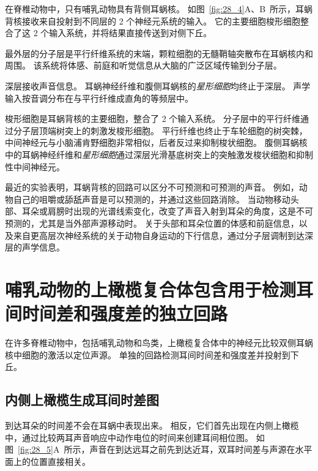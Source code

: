 在脊椎动物中，只有哺乳动物具有背侧耳蜗核。
如图~\ref{fig:28_4}A、B~所示，耳蜗背核接收来自投射到不同层的 2 个神经元系统的输入。
它的主要细胞梭形细胞整合了这 2 个输入系统，并将结果直接传送到对侧下丘。


最外层的分子层是平行纤维系统的末端，颗粒细胞的无髓鞘轴突散布在耳蜗核内和周围。
该系统将体感、前庭和听觉信息从大脑的广泛区域传输到分子层。


深层接收声音信息。
耳蜗神经纤维和腹侧耳蜗核的\textit{星形细胞}均终止于深层。
声学输入按音调分布在与平行纤维成直角的等频层中。


梭形细胞是耳蜗背核的主要细胞，整合了 2 个输入系统。
分子层中的平行纤维通过分子层顶端树突上的刺激发梭形细胞。
平行纤维也终止于车轮细胞的树突棘，中间神经元与小脑浦肯野细胞非常相似，后者反过来抑制梭状细胞。
腹侧耳蜗核中的耳蜗神经纤维和\textit{星形细胞}通过深层光滑基底树突上的突触激发梭状细胞和抑制性中间神经元。


最近的实验表明，耳蜗背核的回路可以区分不可预测和可预测的声音。
例如，动物自己的咀嚼或舔舐声音是可以预测的，并通过这些回路消除。
当动物移动头部、耳朵或肩膀时出现的光谱线索变化，改变了声音入射到耳朵的角度，这是不可预测的，尤其是当外部声源移动时。
关于头部和耳朵位置的体感和前庭信息，以及来自更高层次神经系统的关于动物自身运动的下行信息，通过分子层调制到达深层的声学信息。



\section{哺乳动物的上橄榄复合体包含用于检测耳间时间差和强度差的独立回路}

在许多脊椎动物中，包括哺乳动物和鸟类，上橄榄复合体中的神经元比较双侧耳蜗核中细胞的激活以定位声源。
单独的回路检测耳间时间差和强度差并投射到下丘。



\subsection{内侧上橄榄生成耳间时差图}

到达耳朵的时间差不会在耳蜗中表现出来。
相反，它们首先出现在内侧上橄榄中，通过比较两耳声音响应中动作电位的时间来创建耳间相位图。
如图~\ref{fig:28_5}A~所示，声音在到达远耳之前先到达近耳，双耳时间差与声源在水平面上的位置直接相关。


